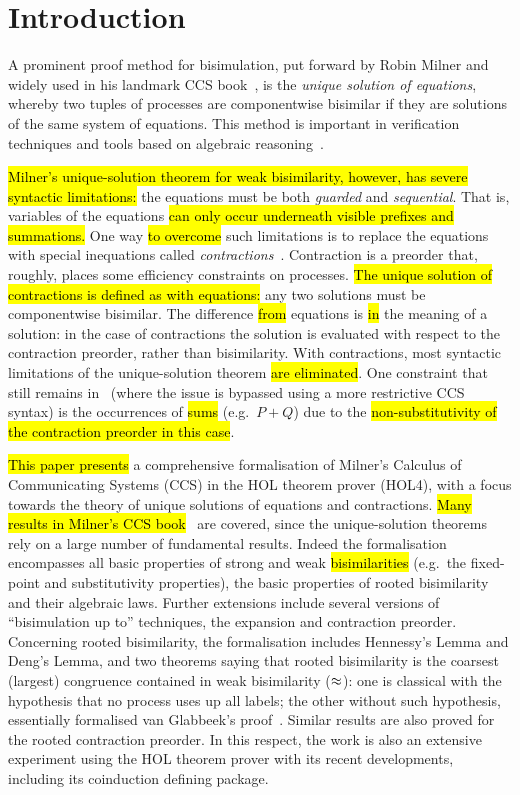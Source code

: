 \section{Introduction}

A prominent proof method for bisimulation, put forward by Robin Milner and widely used in his
landmark CCS book~\cite{Mil89}, is the
\emph{unique solution of equations}, whereby two tuples of processes are
componentwise bisimilar if they are solutions of the same system of equations.
This method is important in verification techniques and tools
based on algebraic reasoning~\cite{BaeBOOK,theoryAndPractice,RosUnder10}. 

\hl{Milner's unique-solution theorem for weak bisimilarity, however,
has severe syntactic limitations:}
the equations must be both \emph{guarded} and \emph{sequential}. That is,
variables of the equations \hl{can only occur underneath visible prefixes and summations.}
One way \hl{to overcome} such limitations is to replace the equations
with special inequations called
\emph{contractions}~\cite{sangiorgi2015equations,sangiorgi2017equations}. Contraction is a
preorder that, roughly, places some efficiency constraints on processes.
\hl{The unique solution of contractions is defined as with equations:}
any two solutions must be componentwise bisimilar.
The difference \hl{from} equations is \hl{in} the meaning of a solution:
in the case of contractions the solution is evaluated with respect to
the contraction preorder, rather than bisimilarity. 
With contractions, most syntactic limitations of the unique-solution theorem \hl{are
eliminated}. One constraint that still remains
in~\cite{sangiorgi2017equations}
(where the issue is bypassed using a more
restrictive CCS syntax)
is the occurrences of %
\hl{sums} (e.g.~$P + Q$) due to
the \hl{non-substitutivity of the contraction preorder in this case}.

 \hl{This paper presents}  a
comprehensive formalisation of Milner's Calculus of Communicating
Systems (CCS) in the HOL theorem prover (HOL4),
with a focus towards the theory of unique solutions of equations and contractions.
\hl{Many results in Milner's CCS book}~\cite{Mil89} are covered, since
the unique-solution theorems rely on a large number of fundamental results.
Indeed the formalisation encompasses all basic properties of strong and weak
\hl{bisimilarities} (e.g.~the fixed-point and substitutivity properties), the
basic properties of rooted bisimilarity and their algebraic laws.
Further extensions include several versions of ``bisimulation up to''
techniques, the expansion and contraction preorder.
Concerning rooted bisimilarity, the formalisation
includes Hennessy's Lemma and Deng's Lemma,
 and two theorems saying that rooted bisimilarity is the coarsest (largest)
 congruence contained in weak bisimilarity ($\approx$): one is classical
 with the hypothesis that no process uses up all labels;
the other without such hypothesis, essentially formalised van Glabbeek's proof~\cite{van2005characterisation}.
Similar results are also proved for the rooted contraction preorder.
In this respect, the work is also an extensive experiment using the HOL theorem prover with its
recent developments, including its coinduction defining package.

